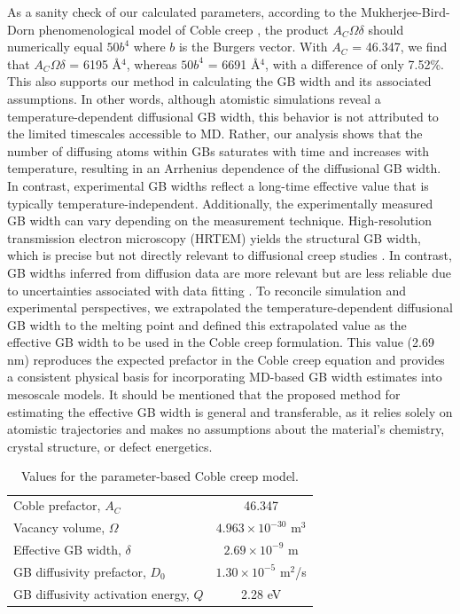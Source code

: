 \documentclass[preprint,12pt,sort&compress]{elsarticle}
\newcommand{\?}{\stackrel{?}{=}}
\begin{document}
As a sanity check of our calculated parameters, according to the Mukherjee-Bird-Dorn phenomenological model of Coble creep \cite{Mukherjee2002}, the product $A_C \Omega \delta$ should numerically equal $50b^4$ where $b$ is the Burgers vector. With $A_C$ = 46.347, we find that $A_C \Omega \delta$ = 6195 \AA$^4$, whereas $50b^4$ = 6691 \AA$^4$, with a difference of only 7.52\%. This also supports our method in calculating the GB width and its associated assumptions. In other words, although atomistic simulations reveal a temperature-dependent diffusional GB width, this behavior is not attributed to the limited timescales accessible to MD. Rather, our analysis shows that the number of diffusing atoms within GBs saturates with time and increases with temperature, resulting in an Arrhenius dependence of the diffusional GB width. In contrast, experimental GB widths reflect a long-time effective value that is typically temperature-independent. Additionally, the experimentally measured GB width can vary depending on the measurement technique. High-resolution transmission electron microscopy (HRTEM) yields the structural GB width, which is precise but not directly relevant to diffusional creep studies \cite{Prokoshkina2013}. In contrast, GB widths inferred from diffusion data are more relevant but are less reliable due to uncertainties associated with data fitting \cite{Prokoshkina2013}. To reconcile simulation and experimental perspectives, we extrapolated the temperature-dependent diffusional GB width to the melting point and defined this extrapolated value as the effective GB width to be used in the Coble creep formulation. This value (2.69 nm) reproduces the expected prefactor in the Coble creep equation and provides a consistent physical basis for incorporating MD-based GB width estimates into mesoscale models. It should be mentioned that the proposed method for estimating the effective GB width is general and transferable, as it relies solely on atomistic trajectories and makes no assumptions about the material's chemistry, crystal structure, or defect energetics.

\begin{table}[h!]
\centering
\caption{Values for the parameter-based Coble creep model.}
\footnotesize
\begin{tabular}{lc}
\hline
Coble prefactor, $A_C$ & 46.347 \\
Vacancy volume, $\Omega$ & $4.963 \times 10^{-30}$ m$^3$ \\
Effective GB width, $\delta$ & $2.69 \times 10^{-9}$ m \\
GB diffusivity prefactor, $D_0$ & $1.30 \times 10^{-5}$ m$^2$/s \\
GB diffusivity activation energy, $Q$ & 2.28 eV \\
\hline
\end{tabular}
\label{Tab:Params}
\end{table}
\end{document}
